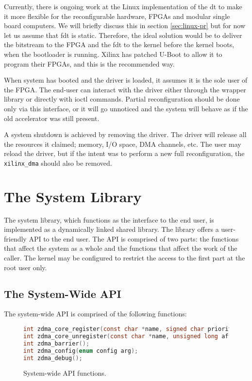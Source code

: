 Currently, there is ongoing work at the Linux implementation of the \gls{dt} to make it more
flexible for the reconfigurable hardware, FPGAs and modular single board computers.
We will briefly discuss this in section \ref{sec:linux-pr} but for now let us assume that \gls{fdt} is static.
Therefore, the ideal solution would be to deliver the bitstream to the FPGA and the \gls{fdt} to the kernel
before the kernel boots, when the bootloader is running. Xilinx has patched U-Boot to allow it to program their FPGAs,
and this is the recommended way.

When system has booted and the driver is loaded, it assumes it is the sole user of the FPGA.
The end-user can interact with the driver either through the wrapper library or directly with ioctl commands.
Partial reconfiguration should be done only via this interface,
or it will go unnoticed and the system will behave as if the old accelerator was still present.

A system shutdown is achieved by removing the driver.
The driver will release all the resources it claimed; memory, I/O space, DMA channels, etc.
The user may reload the driver, but if the intent was to perform a new full reconfiguration,
the \texttt{xilinx\_dma} should also be removed.


\section{The System Library}

The system library, which functions as the interface to the end user,
is implemented as a dynamically linked shared library.
The library offers a user-friendly API to the end user. The API is comprised
of two parts: the functions that affect the system as a whole and the functions
that affect the work of the caller. The kernel may be configured to restrict the access
to the first part at the root user only.


\subsection{The System-Wide API}
\label{sec:sw-api-sys}

The system-wide API is comprised of the following functions:

\begin{figure}[H]
\centering
\begin{lstlisting}[style=basic,language=C]
int zdma_core_register(const char *name, signed char priority, unsigned long affinity);
int zdma_core_unregister(const char *name, unsigned long affinity);
int zdma_barrier();
int zdma_config(enum config arg);
int zdma_debug();
\end{lstlisting}
\caption{System-wide API functions.}
\label{lst:api-system}
\end{figure}

